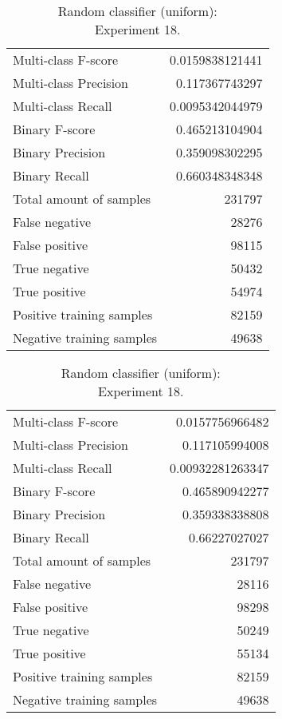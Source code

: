 \begin{table}[H]
\begin{minipage}{0.5\textwidth}
\caption{Random classifier (uniform): \\Experiment 17.}
\centering
\begin{tabular}{l r}
\toprule
Multi-class F-score & 0.0159838121441 \\
Multi-class Precision & 0.117367743297 \\
Multi-class Recall & 0.0095342044979 \\
\midrule
Binary F-score & 0.465213104904 \\
Binary Precision & 0.359098302295 \\
Binary Recall & 0.660348348348 \\
\midrule
Total amount of samples & 231797 \\
False negative & 28276 \\
False positive & 98115 \\
True negative & 50432 \\
True positive & 54974 \\
\midrule
Positive training samples & 82159 \\
Negative training samples & 49638 \\
\bottomrule
\end{tabular}
\end{minipage}
\hfillx
\begin{minipage}{0.5\textwidth}
\caption{Random classifier (uniform): \\Experiment 18.}
\centering
\begin{tabular}{l r}
\toprule
Multi-class F-score & 0.0157756966482 \\
Multi-class Precision & 0.117105994008 \\
Multi-class Recall & 0.00932281263347 \\
\midrule
Binary F-score & 0.465890942277 \\
Binary Precision & 0.359338338808 \\
Binary Recall & 0.66227027027 \\
\midrule
Total amount of samples & 231797 \\
False negative & 28116 \\
False positive & 98298 \\
True negative & 50249 \\
True positive & 55134 \\
\midrule
Positive training samples & 82159 \\
Negative training samples & 49638 \\
\bottomrule
\end{tabular}
\end{minipage}
\end{table}
